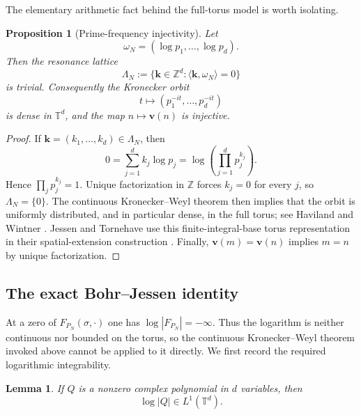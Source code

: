 \documentclass[11pt]{article}
\newtheorem{proposition}[theorem]{Proposition}
\newtheorem{lemma}[theorem]{Lemma}
\theoremstyle{definition}
\newcommand{\Z}{\mathbb Z}
\newcommand{\T}{\mathbb T}
\newcommand{\1}{\mathbf 1}
\begin{document}
The elementary arithmetic fact behind the full-torus model is worth isolating.

\begin{proposition}[Prime-frequency injectivity]\label{prop:prime-injectivity}
Let
\[
\omega_N=(\log p_1,\ldots,\log p_d).
\]
Then the resonance lattice
\[
\Lambda_N:=\{\mathbf k\in\Z^d:\langle\mathbf k,\omega_N\rangle=0\}
\]
is trivial.  Consequently the Kronecker orbit
\[
t\longmapsto(p_1^{-it},\ldots,p_d^{-it})
\]
is dense in $\T^d$, and the map $n\mapsto\mathbf v(n)$ is injective.
\end{proposition}

\begin{proof}
If $\mathbf k=(k_1,\ldots,k_d)\in\Lambda_N$, then
\[
0=\sum_{j=1}^dk_j\log p_j
=\log\left(\prod_{j=1}^dp_j^{k_j}\right).
\]
Hence $\prod_jp_j^{k_j}=1$.  Unique factorization in $\Z$ forces $k_j=0$ for every $j$, so $\Lambda_N=\{0\}$.  The continuous Kronecker--Weyl theorem then implies that the orbit is uniformly distributed, and in particular dense, in the full torus; see Haviland and Wintner \cite{HavilandWintner1934}.  Jessen and Tornehave use this finite-integral-base torus representation in their spatial-extension construction \cite[\S116]{JessenTornehave1945}.  Finally, $\mathbf v(m)=\mathbf v(n)$ implies $m=n$ by unique factorization.
\end{proof}



\subsection{The exact Bohr--Jessen identity}

At a zero of $F_{P_N}(\sigma,\cdot)$ one has $\log|F_{P_N}|=-\infty$.  Thus the logarithm is neither continuous nor bounded on the torus, so the continuous Kronecker--Weyl theorem invoked above cannot be applied to it directly.  We first record the required logarithmic integrability.

\begin{lemma}\label{lem:log-integrable}
If $Q$ is a nonzero complex polynomial in $d$ variables, then
\[
\log|Q|\in L^1(\T^d).
\]
\end{lemma}
\end{document}
